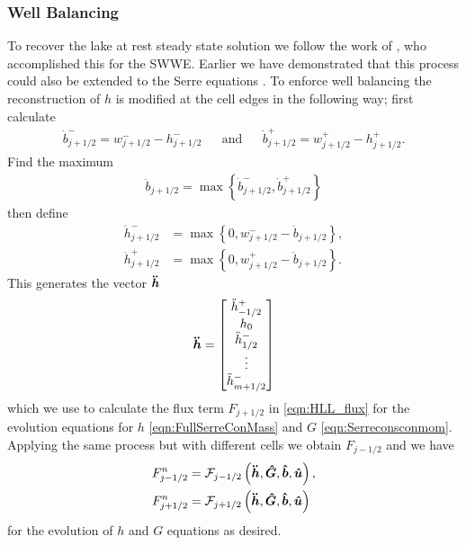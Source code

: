 \subsubsection{Well Balancing}
To recover the lake at rest steady state solution we follow the work of \citet{Klein-etal-2004-2050}, who accomplished this for the SWWE. Earlier we have demonstrated that this process could also be extended to the Serre equations \cite{Pitt-J-2014}. To enforce well balancing the reconstruction of $h$ is modified at the cell edges in the following way; first calculate
\begin{align}
\dot{b}^-_{j+1/2} = w^-_{j+1/2} - h^-_{j+1/2} & &\text{and}& &\dot{b}^+_{j+1/2} = w^+_{j+1/2} - h^+_{j+1/2}.
\label{eqn:BedReDefWmH}
\end{align}
Find the maximum
\begin{align*}
\ddot{b}_{j+1/2} = \max\left\lbrace\dot{b}^-_{j+1/2} , \dot{b}^+_{j+1/2} \right\rbrace
\end{align*}
then define
\begin{subequations}
\begin{align}
\ddot{h}^-_{j+1/2} &= \max\left\lbrace 0, w^-_{j+1/2} - \ddot{b}_{j+1/2}  \right\rbrace, \\  \ddot{h}^+_{j+1/2} &= \max\left\lbrace 0, w^+_{j+1/2} - \ddot{b}_{j+1/2} \right\rbrace.
\end{align}
\label{eqn:ModifiedHValue}
\end{subequations}
This generates the vector $\boldsymbol{\ddot{h}}$
\begin{equation*}
\boldsymbol{\ddot{h}}= \begin{bmatrix}
\ddot{h}^+_{-1/2} \\ h_0 \\ \ddot{h}^-_{1/2} \\ \vdots  \\ \ddot{h}^-_{m + 1/2} \end{bmatrix}
\end{equation*}
which we use to calculate the flux term $F_{j+1/2}$ in \eqref{eqn:HLL_flux} for the evolution equations for $h$ \eqref{eqn:FullSerreConMass} and $G$ \eqref{eqn:Serreconsconmom}. Applying the same process but with different cells we obtain $F_{j-1/2}$ and we have
\begin{subequations}
\begin{align}	
F^n_{j-1/2} &=\mathcal{F}_{j-1/2} \left(\boldsymbol{\ddot{h}}, \boldsymbol{\hat{G}},\boldsymbol{\hat{b}}, \boldsymbol{\hat{u}}  \right),\\
F^n_{j+1/2} &=\mathcal{F}_{j+1/2} \left(\boldsymbol{\ddot{h}}, \boldsymbol{\hat{G}},\boldsymbol{\hat{b}}, \boldsymbol{\hat{u}}  \right)
\label{eqn:FluxFEVM}
\end{align}
\end{subequations}
for the evolution of $h$ and $G$ equations as desired.

